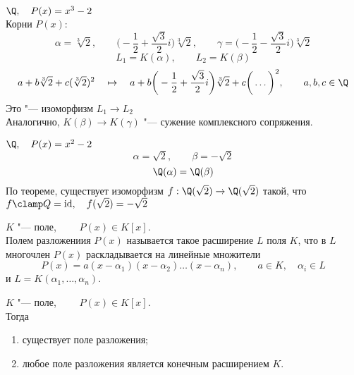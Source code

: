 \begin{exmpls}
	\item $ \Q, \quad P(x) = x^3 - 2 $ \\
	Корни $ P(x) $:
	$$ \alpha = \sqrt[3]2, \qquad \bigg( -\frac12 + \frac{\sqrt3}2i \bigg)\sqrt[3]2, \qquad \gamma = \bigg( -\frac12 - \frac{\sqrt3}2i \bigg)\sqrt[3]2 $$
	$$ L_1 = K(\alpha), \qquad L_2 = K(\beta) $$
	$$ a + b\sqrt[3]2 + c(\sqrt[3]2)^2 \quad \mapsto \quad a + b \bigg( -\frac12 + \frac{\sqrt3}2i \bigg) \sqrt[3]2 + c \bigg( \dots \bigg)^2, \qquad a, b, c \in \Q $$
	Это "--- изоморфизм $ L_1 \to L_2 $ \\
	Аналогично, $ K(\beta) \to K(\gamma) $ "--- сужение комплексного сопряжения.
	\item $ \Q, \quad P(x) = x^2 - 2 $
	$$ \alpha = \sqrt2, \qquad \beta = -\sqrt2 $$
	$$ \Q(\alpha) = \Q(\beta) $$
	По теореме, существует изоморфизм $ f : \Q(\sqrt2) \to \Q(\sqrt2) $ такой, что $ f\clamp Q = \operatorname{id}, \quad f(\sqrt2) = -\sqrt 2 $
\end{exmpls}

\begin{definition}
	$ K $ "--- поле, $ \qquad P(x) \in K[x] $. \\
	Полем разложениия $ P(x) $ называется такое расширение $ L $ поля $ K $, что в $ L $ многочлен $ P(x) $ раскладывается на линейные множители
	$$ P(x) = a(x - \alpha_1)(x - \alpha_2)\dots(x - \alpha_n), \qquad a \in K, \quad \alpha_i \in L $$
	и $ L = K(\alpha_1, \dots, \alpha_n) $.
\end{definition}

\begin{theorem}
	$ K $ "--- поле, $ \qquad P(x) \in K[x] $. \\
	Тогда
	\begin{enumerate}
		\item существует поле разложения;
		\item любое поле разложения является конечным расширением $ K $.
	\end{enumerate}
\end{theorem}

